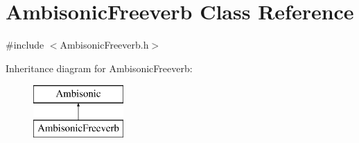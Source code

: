 \hypertarget{class_ambisonic_freeverb}{\section{Ambisonic\-Freeverb Class Reference}
\label{class_ambisonic_freeverb}
}


{\ttfamily \#include $<$Ambisonic\-Freeverb.\-h$>$}

Inheritance diagram for Ambisonic\-Freeverb\-:\begin{figure}[H]
\begin{center}
\leavevmode
\includegraphics[height=2.000000cm]{class_ambisonic_freeverb}
\end{center}
\end{figure}
